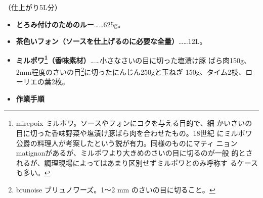 
（仕上がり5L分）

\begin{itemize}
\item
  \textbf{とろみ付けのためのルー}\ldots{}\ldots{}625g。
\item
  \textbf{茶色いフォン（ソースを仕上げるのに必要な全量）}\ldots{}\ldots{}12L。
\item
  \textbf{ミルポワ\footnote{mirepoix
    ミルポワ。ソースやフォンにコクを与える目的で、細
    かいさいの目に切った香味野菜や塩漬け豚ばら肉を合わせたもの。18世紀
    にミルポワ公爵の料理人が考案したという説が有力。同様のものにマティ
    ニョンmatignonがあるが、ミルポワより大きめのさいの目に切るのが一般
    的とされるが、調理現場によってはあまり区別せずミルポワとのみ呼称す
    るケースも多い。}（香味素材）}\ldots{}\ldots{}小さなさいの目に切った塩漬け豚
  ばら肉150g、2mm程度のさいの目\footnote{brunoise ブリュノワーズ。1〜2
    mm のさいの目に切ること。}に切ったにんじん250gと玉ねぎ
  150g、タイム2枝、ローリエの葉2枚。\hypertarget{mirepoix}{}
  \label{mirepoix}
\item
  \textbf{作業手順}
\end{itemize}

